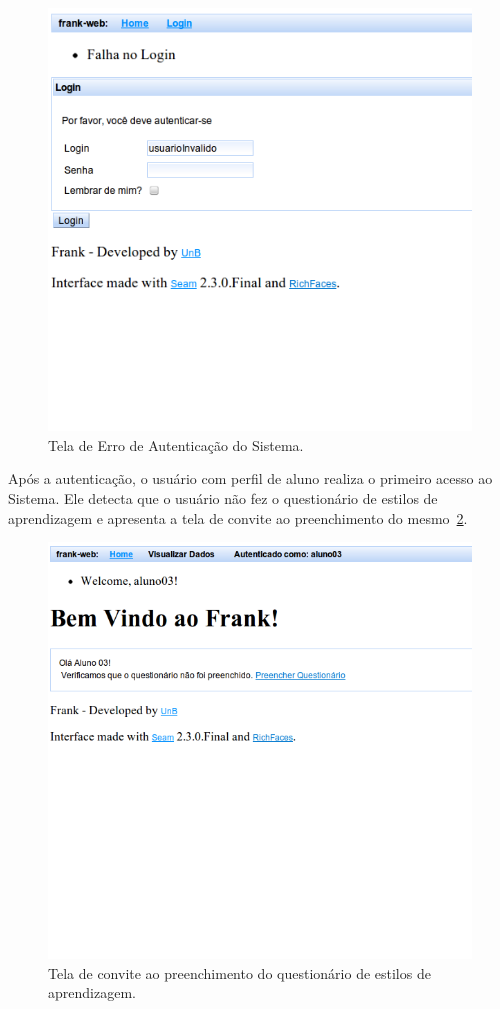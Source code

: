 \begin{figure}
	\centering
	\includegraphics[scale=0.6]{images/frank-tela-login-invalido.png}
	\caption{Tela de Erro de Autenticação do Sistema.}
	\label{fig:frank-tela-login-invalido}
\end{figure}

Após a autenticação, o usuário com perfil de aluno realiza o primeiro acesso ao Sistema. Ele detecta que o usuário não fez o questionário de estilos de aprendizagem e apresenta a tela de convite ao preenchimento do mesmo~\ref{fig:frank-tela-aluno-prim-acesso}.

\begin{figure}
	\centering
	\includegraphics[scale=0.6]{images/frank-tela-aluno-prim-acesso.png}
	\caption{Tela de convite ao preenchimento do questionário de estilos de aprendizagem.}
	\label{fig:frank-tela-aluno-prim-acesso}
\end{figure}

